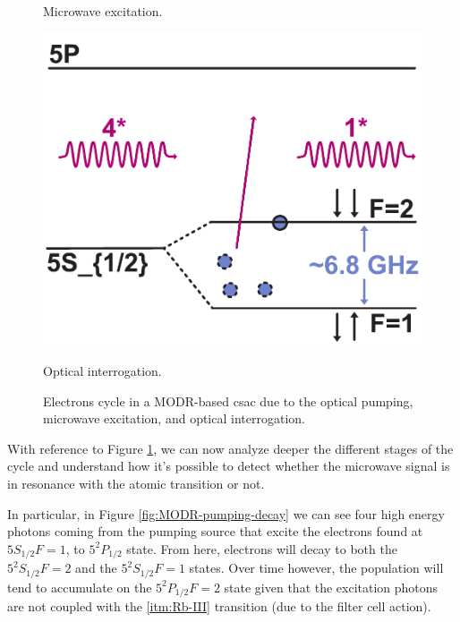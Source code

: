 \begin{figure}[H]
\begin{minipage}[t]{0.3\linewidth}
        \caption{Microwave excitation.}
        \label{fig:MODR-microwave}
    \end{minipage}
    \hfill
    \begin{minipage}[t]{0.3\linewidth}
        \centering
        \includegraphics[width=\linewidth]{pdf/MODR/interrogation.pdf}
        \caption{Optical interrogation.}
        \label{fig:MODR-interrogation}
    \end{minipage}

    \caption{Electrons cycle in a MODR-based \acrshort{csac} due to the optical pumping, microwave excitation, and optical interrogation.}
    \label{fig:MODR-steps}
\end{figure}

With reference to Figure \ref{fig:MODR-steps}, we can now analyze deeper the different stages of the cycle and understand how it's possible to detect whether the microwave signal is in resonance with the atomic transition or not.

In particular, in Figure \ref{fig:MODR-pumping-decay} we can see four high energy photons coming from the pumping source that excite the electrons found at $5S_{1/2} F=1$, to $5^2P_{1/2}$ state.
From here, electrons will decay to both the $5^2S_{1/2} F=2$ and the $5^2S_{1/2} F=1$ states.
Over time however, the population will tend to accumulate on the $5^2P_{1/2} F=2$ state given that the excitation photons are not coupled with the \ref{itm:Rb-III} transition (due to the filter cell action).

